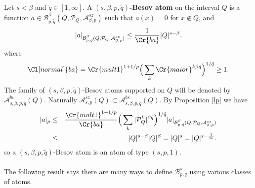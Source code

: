 \documentclass{amsart}
\theoremstyle{definition}
\newcommand{\Cll}[2][normal]{\Cl[#1]{#2}}
\newcommand{\Crr}[1]{\Cr{#1}}
\begin{document}
Let $s < \beta$ and $\tilde{q}\in [1,\infty]$. A  {\bf $(s,\beta,p,\tilde{q})$-Besov atom}  on the interval $Q$ is a function $a \in \mathcal{B}^\beta_{p,\tilde{q}}(Q, \mathcal{P}_Q, \mathcal{A}^{sz}_{\beta,p})$ such that  $a(x)=0$ for $x \not\in Q$,
and
$$|a|_{\mathcal{B}^\beta_{p,\tilde{q}}(Q, \mathcal{P}_Q, \mathcal{A}^{sz}_{\beta,p})}\leq \frac{1}{\Crr{ba}} |Q|^{s-\beta}.$$
where 
$$\Cll{ba}=\Crr{mult1}^{1+1/p}  \Big( \sum_k \Crr{maior}^{k\beta\tilde{q}}    \Big)^{1/\tilde{q}}\geq 1.$$
The family of $(s,\beta,p,\tilde{q})$-Besov atoms supported on $Q$ will be denoted by  $\mathcal{A}^{bv}_{s,\beta,p,\tilde{q}}(Q)$.  Naturally $\mathcal{A}^{sz}_{s,p}(Q)\subset \mathcal{A}^{bs}_{s,\beta,p,\tilde{q}}(Q)$. By Proposition \ref{lp}  we have
\begin{eqnarray}
|a|_{p}&\leq&  \frac{\Crr{mult1}^{1+1/p}}{\Crr{ba}}  \Big( \sum_k |\mathcal{P}^k_Q|^{\beta\tilde{q}}    \Big)^{1/\tilde{q}} |a|_{\mathcal{B}^\beta_{p,\tilde{q}}(Q, \mathcal{P}_Q, \mathcal{A}^{sz}_{\beta,p})}\\
&\leq&  |Q|^{s-\beta} |Q|^{\beta} =  |Q|^s=  |Q|^{s-\frac{1}{\infty}}. 
\end{eqnarray} 
so a $(s,\beta,p,\tilde{q})$-Besov atom is an atom of  type $(s,p,1)$. \\ \\

The following result says there are many ways to define $\mathcal{B}^s_{p,q}$ using various classes of atoms. 
\end{document}

